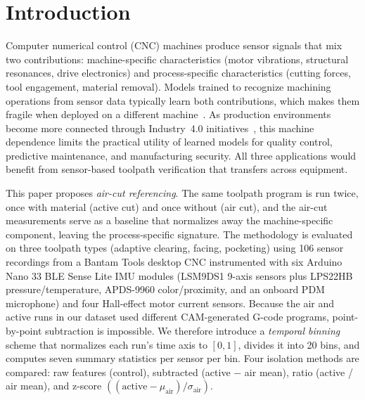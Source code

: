 \section{Introduction}\label{sec:introduction}

Computer numerical control (CNC) machines produce sensor signals that mix two contributions: machine-specific characteristics (motor vibrations, structural resonances, drive electronics) and process-specific characteristics (cutting forces, tool engagement, material removal). Models trained to recognize machining operations from sensor data typically learn both contributions, which makes them fragile when deployed on a different machine~\cite{jardine2006review, li2020transfer}. As production environments become more connected through Industry~4.0 initiatives~\cite{teti2010advanced, byrne1995tool}, this machine dependence limits the practical utility of learned models for quality control, predictive maintenance, and manufacturing security. All three applications would benefit from sensor-based toolpath verification that transfers across equipment.

This paper proposes \emph{air-cut referencing}. The same toolpath program is run twice, once with material (active cut) and once without (air cut), and the air-cut measurements serve as a baseline that normalizes away the machine-specific component, leaving the process-specific signature. The methodology is evaluated on three toolpath types (adaptive clearing, facing, pocketing) using 106 sensor recordings from a Bantam Tools desktop CNC instrumented with six Arduino Nano 33 BLE Sense Lite IMU modules (LSM9DS1 9-axis sensors plus LPS22HB pressure/temperature, APDS-9960 color/proximity, and an onboard PDM microphone) and four Hall-effect motor current sensors. Because the air and active runs in our dataset used different CAM-generated G-code programs, point-by-point subtraction is impossible. We therefore introduce a \emph{temporal binning} scheme that normalizes each run's time axis to $[0, 1]$, divides it into 20 bins, and computes seven summary statistics per sensor per bin. Four isolation methods are compared: raw features (control), subtracted (active $-$ air mean), ratio (active / air mean), and z-score $((\text{active} - \mu_\text{air}) / \sigma_\text{air})$.

